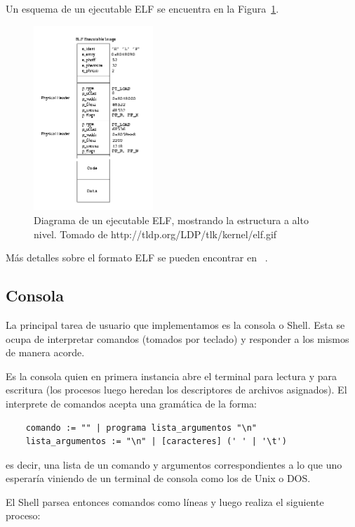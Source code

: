 	Un esquema de un ejecutable ELF se encuentra en
	la Figura~\ref{fig::elf}.

	\begin{figure}[H]
		\caption{Diagrama de un ejecutable ELF, mostrando la estructura a alto nivel. Tomado de http://tldp.org/LDP/tlk/kernel/elf.gif} 
		\label{fig::elf}
		\centering
		\includegraphics[width=0.4\textwidth]{elf.png}
	\end{figure}

	M\'as detalles sobre el formato ELF se pueden encontrar en ~\cite{abi}.

\subsection{Consola}

La principal tarea de usuario que implementamos es la consola
o Shell. Esta se ocupa de interpretar comandos (tomados por teclado) y responder
a los mismos de manera acorde.

Es la consola quien en primera instancia abre el terminal para lectura y para escritura
(los procesos luego heredan los descriptores de archivos asignados). El interprete de
comandos acepta una gram\'atica de la forma:

\begin{verbatim}
	comando := "" | programa lista_argumentos "\n"
	lista_argumentos := "\n" | [caracteres] (' ' | '\t')
\end{verbatim}

es decir, una lista de un comando y argumentos correspondientes a lo que uno esperar\'ia
viniendo de un terminal de consola como los de Unix o DOS.

El Shell parsea entonces comandos como l\'ineas y luego realiza el siguiente proceso:

